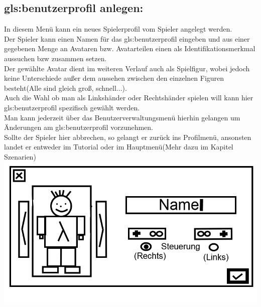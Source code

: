 \documentclass{scrartcl}
\begin{document}
\begin{enumerate}
	\begin{minipage}{1\textwidth}
		\item \subsection*{\gls{gls:benutzerprofil} anlegen:}
		In diesem Menü kann ein neues Spielerprofil vom Spieler angelegt werden.\\
		Der Spieler kann einen Namen für das \gls{gls:benutzerprofil} eingeben und aus einer gegebenen Menge an Avataren bzw. Avatarteilen einen als Identifikationsmerkmal aussuchen bzw zusammen setzen.\\
		Der gewählte Avatar dient im weiteren Verlauf auch als Spielfigur, wobei jedoch keine Unterschiede außer dem aussehen zwischen den einzelnen Figuren besteht(Alle sind gleich groß, schnell...).\\
		Auch die Wahl ob man als Linkshänder oder Rechtshänder spielen will kann hier \gls{gls:benutzerprofil} spezifisch gewählt werden.\\
		Man kann jederzeit über das Benutzerverwaltungsmenü hierhin gelangen um Änderungen am \gls{gls:benutzerprofil} vorzunehmen.\\
		Sollte der Spieler hier abbrechen, so gelangt er zurück ins Profilmenü, ansonsten landet er entweder im Tutorial oder im Hauptmenü(Mehr dazu im Kapitel Szenarien)\\
		\includegraphics[scale=0.5]{assets/CreateProfile2}
	\end{minipage}
	

\end{enumerate}
\end{document}
